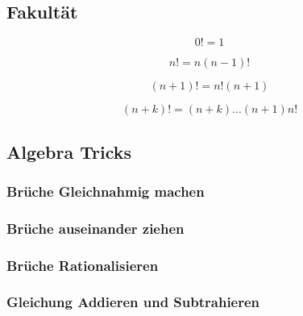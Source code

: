    
\subsection{Fakultät}
$$0! = 1$$

$$n!=n(n-1)!$$

$$(n+1)!=n!(n+1)$$

$$(n+k)!=(n+k)...(n+1)n!$$

\subsection{Algebra Tricks}

\subsubsection{Brüche Gleichnahmig machen}

\subsubsection{Brüche auseinander ziehen}

\subsubsection{Brüche Rationalisieren}

\subsubsection{Gleichung Addieren und Subtrahieren}